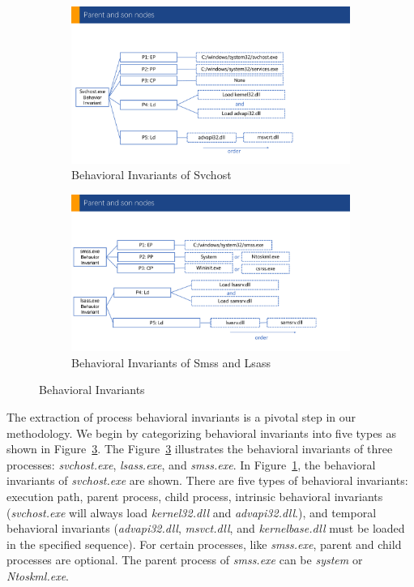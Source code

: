 \begin{figure}[h]
  \begin{subfigure}{.45\textwidth}
      \includegraphics[width=\textwidth]{figs/cons-svchost.pdf}
      \caption{Behavioral Invariants of Svchost}
      \label{fig:cons-svchost}
  \end{subfigure}
  \hfill
  \begin{subfigure}{.5\textwidth}
      \includegraphics[width=\textwidth]{figs/cons-smss-lsass.pdf}
      \caption{Behavioral Invariants of Smss and Lsass}
      \label{fig:cons-smss-lsass}
  \end{subfigure}
  \hfill
  \caption{Behavioral Invariants}
  \label{fig:cons-def}
 \end{figure}

The extraction of process behavioral invariants is a pivotal step in our methodology. We begin by categorizing behavioral invariants into five types as shown in Figure~\ref{fig:cons-def}.
The Figure~\ref{fig:cons-def} illustrates the behavioral invariants of three processes: \textit{svchost.exe}, \textit{lsass.exe}, and \textit{smss.exe}. In Figure~\ref{fig:cons-svchost}, the behavioral invariants of \textit{svchost.exe} are shown. There are five types of behavioral invariants: execution path, parent process, child process, intrinsic behavioral invariants (\textit{svchost.exe} will always load \textit{kernel32.dll} and \textit{advapi32.dll}.), and temporal behavioral invariants (\textit{advapi32.dll}, \textit{msvct.dll}, and \textit{kernelbase.dll} must be loaded in the specified sequence).
For certain processes, like \textit{smss.exe}, parent and child processes are optional. The parent process of \textit{smss.exe} can be \textit{system} or \textit{Ntoskml.exe}.

